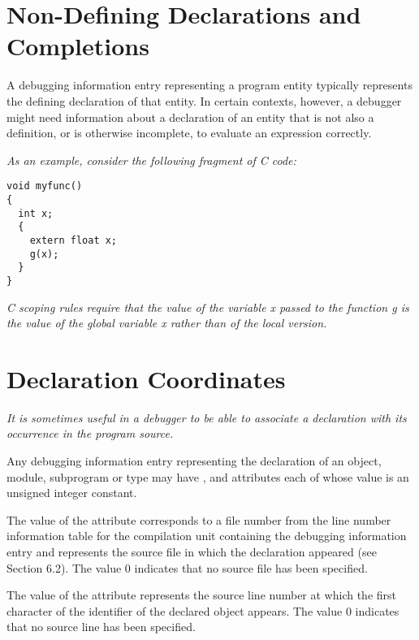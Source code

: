 \section{Non-Defining Declarations and Completions}
\label{nondefiningdeclarationsandcompletions}
A debugging information entry representing a program entity
typically represents the defining declaration of that
entity. In certain contexts, however, a debugger might need
information about a declaration of an entity that is not
also a definition, or is otherwise incomplete, to evaluate
an expression correctly.

\textit{As an example, consider the following fragment of C code:}

\begin{lstlisting}
void myfunc()
{
  int x;
  {
    extern float x;
    g(x);
  }
}
\end{lstlisting}


\textit{C scoping rules require that the 
value of the variable x passed to the function g is the value of the
global variable x rather than of the local version.}


\section{Declaration Coordinates}
\label{chap:declarationcoordinates}
\textit{It is sometimes useful in a debugger to be able to associate
a declaration with its occurrence in the program source.
}

Any debugging information entry representing the
declaration of an object, module, subprogram or type may have
,  and 
attributes each of whose value is an unsigned integer constant.

The value of the  attribute corresponds to
a file number from the line number information table for the
compilation unit containing the debugging information entry and
represents the source file in which the declaration appeared
(see Section 6.2). The value 0 indicates that no source file
has been specified.

The value of the  attribute represents
the source line number at which the first character of
the identifier of the declared object appears. The value 0
indicates that no source line has been specified.

